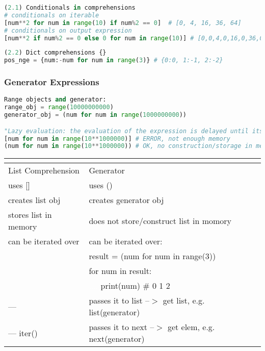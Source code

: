 \documentclass[12pt]{article}
\begin{document}
\begin{lstlisting}[language=Python]
(2.1) Conditionals in comprehensions
# conditionals on iterable
[num**2 for num in range(10) if num%2 == 0]  # [0, 4, 16, 36, 64]
# conditionals on output expression
[num**2 if num%2 == 0 else 0 for num in range(10)] # [0,0,4,0,16,0,36,0,64,0]
\end{lstlisting}

\begin{lstlisting}[language=Python]
(2.2) Dict comprehensions {}
pos_nge = {num:-num for num in range(3)} # {0:0, 1:-1, 2:-2}
\end{lstlisting}

\subsubsection{\normalsize Generator Expressions}
\begin{lstlisting}[language=Python]
Range objects and generator:
range_obj = range(10000000000)
generator_obj = (num for num in range(1000000000))

"Lazy evaluation: the evaluation of the expression is delayed until its values is needed."
[num for num in range(10**1000000)] # ERROR, not enough memory
(num for num in range(10**1000000)) # OK, no construction/storage in memory
\end{lstlisting}

\begin{table}[!ht]
\centering
\begin{tabular}{l | l }
\multicolumn{1}{l}{} \\ [-10pt]
\hline
List Comprehension & Generator \\
\hline\hline
uses [] & uses () \\
\hline
creates list obj & creates generator obj\\
\hline
stores list in memory & does not store/construct list in momory \\
\hline
can be iterated over & can be iterated over: \\
& result = (num for num in range(3)) \\
& for num in result: \\
& \textcolor{white}{....} print(num) \# 0 1 2 \\
\hline
--- & passes it to list --$>$ get list, e.g. list(generator) \\
\hline
--- iter() & passes it to next --$>$ get elem, e.g. next(generator) \\
\hline
\end{tabular}
\end{table}
\end{document}
